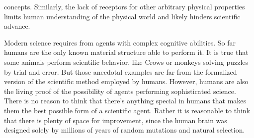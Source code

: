 \documentclass[11pt,a4paper,twoside]{report}
\newcommand{\+}{\textnormal{+} }
\theoremstyle{definition}
\numberwithin{equation}{chapter}
\begin{document}
concepts. Similarly, the lack of receptors for other arbitrary physical
properties limits human understanding of the physical world and likely hinders
scientific advance. \\ 
\par 
Modern science requires from agents with complex cognitive abilities. So far
humans are the only known material structure able to perform it. It is true that
some animals perform scientific behavior, like Crows or monkeys solving puzzles
by trial and error. But those anecdotal examples are far from the formalized
version of the scientific method employed by humans. However, humans are also
the living proof of the possibility of agents performing sophisticated science.
There is no reason to think that there's anything special in humans that makes
them the best possible form of a scientific agent. Rather it is reasonable to
think that there is plenty of space for improvement, since the human brain was
designed solely by millions of years of random mutations and natural selection.
\end{document}
